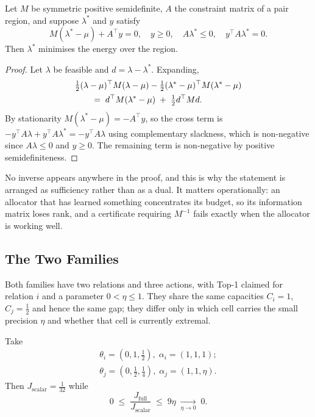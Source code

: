 \begin{theorem}
\label{thm:fn-kkt}
Let $M$ be symmetric positive semidefinite, $A$ the constraint matrix of a pair region, and
suppose $\lambda^{*}$ and $y$ satisfy
\begin{equation}
M(\lambda^{*}-\mu)+A^{\top}y=0,\quad
y\geq 0,\quad
A\lambda^{*}\leq 0,\quad
y^{\top}A\lambda^{*}=0 .
\label{eq:fn-kkt}
\end{equation}
Then $\lambda^{*}$ minimises the energy over the region.
\end{theorem}

\begin{proof}
Let $\lambda$ be feasible and $d=\lambda-\lambda^{*}$. Expanding,
\begin{align}
&\tfrac12(\lambda-\mu)^{\top}M(\lambda-\mu)
 -\tfrac12(\lambda^{*}-\mu)^{\top}M(\lambda^{*}-\mu) \notag\\
&\qquad=\;d^{\top}M(\lambda^{*}-\mu)\;+\;\tfrac12 d^{\top}Md .
\end{align}
By stationarity $M(\lambda^{*}-\mu)=-A^{\top}y$, so the cross term is
$-y^{\top}A\lambda+y^{\top}A\lambda^{*}=-y^{\top}A\lambda$ using complementary slackness,
which is non-negative since $A\lambda\le0$ and $y\ge0$. The remaining term is non-negative by
positive semidefiniteness.
\end{proof}


No inverse appears anywhere in the proof, and this is why the statement is arranged as
sufficiency rather than as a dual. It matters operationally: an allocator that has learned
something concentrates its budget, so its information matrix loses rank, and a certificate
requiring $M^{-1}$ fails exactly when the allocator is working well.

\subsection{The Two Families}
\label{sec:fn-families}

Both families have two relations and three actions, with Top-1 claimed for relation $i$ and a
parameter $0<\eta\le1$. They share the same capacities $C_{i}=1$, $C_{j}=\tfrac12$ and hence
the same gap; they differ only in which cell carries the small precision $\eta$ and whether
that cell is currently extremal.

\begin{theorem}
\label{thm:fn-family1}
Take
\begin{align}
\theta_{i}=(0,1,\tfrac12),\;\alpha_{i}=(1,1,1);\\
\theta_{j}=(0,\tfrac12,\tfrac14),\;\alpha_{j}=(1,1,\eta).
\end{align}
Then $J_{\mathrm{scalar}}=\tfrac{1}{32}$ while
\begin{equation}
0\;\leq\;\frac{J_{\mathrm{full}}}{J_{\mathrm{scalar}}}\;\leq\;9\eta
\;\xrightarrow[\eta\to0]{}\;0 .
\label{eq:fn-family1}
\end{equation}
\end{theorem}

